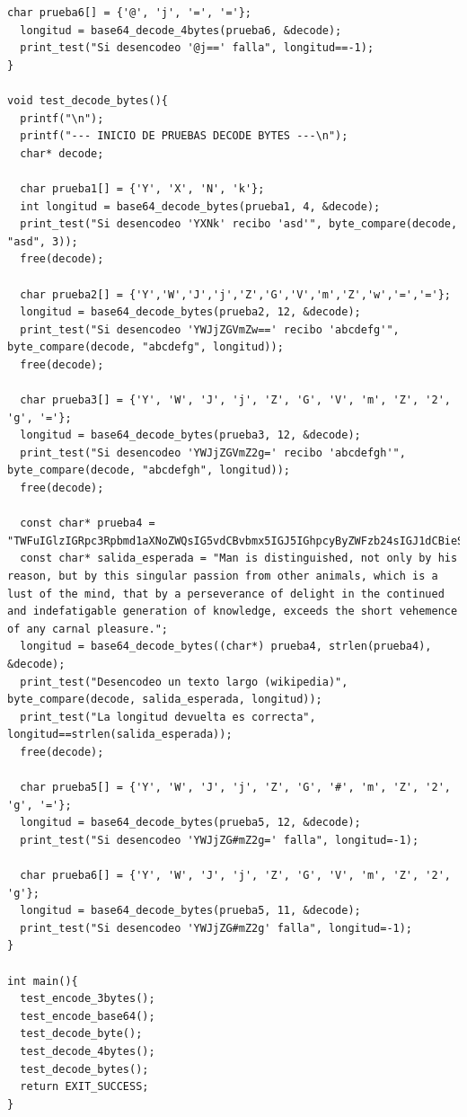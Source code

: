 \documentclass[11pt]{article}
\begin{document}
\begin{lstlisting}[style=Cstyle]
  char prueba6[] = {'@', 'j', '=', '='};
  longitud = base64_decode_4bytes(prueba6, &decode);
  print_test("Si desencodeo '@j==' falla", longitud==-1);
}

void test_decode_bytes(){
  printf("\n");
  printf("--- INICIO DE PRUEBAS DECODE BYTES ---\n");
  char* decode;

  char prueba1[] = {'Y', 'X', 'N', 'k'};
  int longitud = base64_decode_bytes(prueba1, 4, &decode);
  print_test("Si desencodeo 'YXNk' recibo 'asd'", byte_compare(decode, "asd", 3));
  free(decode);

  char prueba2[] = {'Y','W','J','j','Z','G','V','m','Z','w','=','='};
  longitud = base64_decode_bytes(prueba2, 12, &decode);
  print_test("Si desencodeo 'YWJjZGVmZw==' recibo 'abcdefg'", byte_compare(decode, "abcdefg", longitud));
  free(decode);

  char prueba3[] = {'Y', 'W', 'J', 'j', 'Z', 'G', 'V', 'm', 'Z', '2', 'g', '='};
  longitud = base64_decode_bytes(prueba3, 12, &decode);
  print_test("Si desencodeo 'YWJjZGVmZ2g=' recibo 'abcdefgh'", byte_compare(decode, "abcdefgh", longitud));
  free(decode);

  const char* prueba4 = "TWFuIGlzIGRpc3Rpbmd1aXNoZWQsIG5vdCBvbmx5IGJ5IGhpcyByZWFzb24sIGJ1dCBieSB0aGlzIHNpbmd1bGFyIHBhc3Npb24gZnJvbSBvdGhlciBhbmltYWxzLCB3aGljaCBpcyBhIGx1c3Qgb2YgdGhlIG1pbmQsIHRoYXQgYnkgYSBwZXJzZXZlcmFuY2Ugb2YgZGVsaWdodCBpbiB0aGUgY29udGludWVkIGFuZCBpbmRlZmF0aWdhYmxlIGdlbmVyYXRpb24gb2Yga25vd2xlZGdlLCBleGNlZWRzIHRoZSBzaG9ydCB2ZWhlbWVuY2Ugb2YgYW55IGNhcm5hbCBwbGVhc3VyZS4=";
  const char* salida_esperada = "Man is distinguished, not only by his reason, but by this singular passion from other animals, which is a lust of the mind, that by a perseverance of delight in the continued and indefatigable generation of knowledge, exceeds the short vehemence of any carnal pleasure.";
  longitud = base64_decode_bytes((char*) prueba4, strlen(prueba4), &decode);
  print_test("Desencodeo un texto largo (wikipedia)", byte_compare(decode, salida_esperada, longitud));
  print_test("La longitud devuelta es correcta", longitud==strlen(salida_esperada));
  free(decode);

  char prueba5[] = {'Y', 'W', 'J', 'j', 'Z', 'G', '#', 'm', 'Z', '2', 'g', '='};
  longitud = base64_decode_bytes(prueba5, 12, &decode);
  print_test("Si desencodeo 'YWJjZG#mZ2g=' falla", longitud=-1);

  char prueba6[] = {'Y', 'W', 'J', 'j', 'Z', 'G', 'V', 'm', 'Z', '2', 'g'};
  longitud = base64_decode_bytes(prueba5, 11, &decode);
  print_test("Si desencodeo 'YWJjZG#mZ2g' falla", longitud=-1);
}

int main(){
  test_encode_3bytes();
  test_encode_base64();
  test_decode_byte();
  test_decode_4bytes();
  test_decode_bytes();
  return EXIT_SUCCESS;
}    \end{lstlisting}
\end{document}
